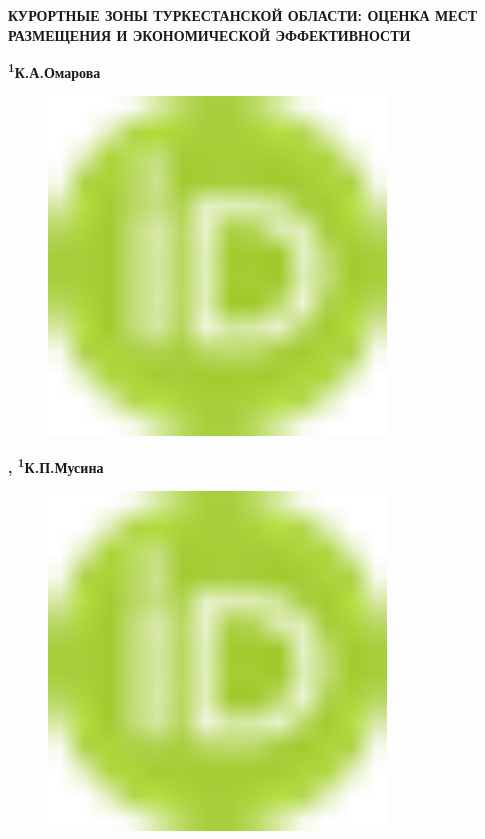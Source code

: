 
{\bfseries КУРОРТНЫЕ ЗОНЫ ТУРКЕСТАНСКОЙ ОБЛАСТИ: ОЦЕНКА МЕСТ РАЗМЕЩЕНИЯ И
ЭКОНОМИЧЕСКОЙ ЭФФЕКТИВНОСТИ}

{\bfseries \textsuperscript{1}К.А.Омарова}
\begin{figure}[H]
	\centering
	\includegraphics[width=0.8\textwidth]{media/ekon2/image1}
	\caption*{}
\end{figure}
{\bfseries \textsuperscript{\envelope },
\textsuperscript{1}К.П.Мусина}
\begin{figure}[H]
	\centering
	\includegraphics[width=0.8\textwidth]{media/ekon2/image1}
	\caption*{}
\end{figure}
